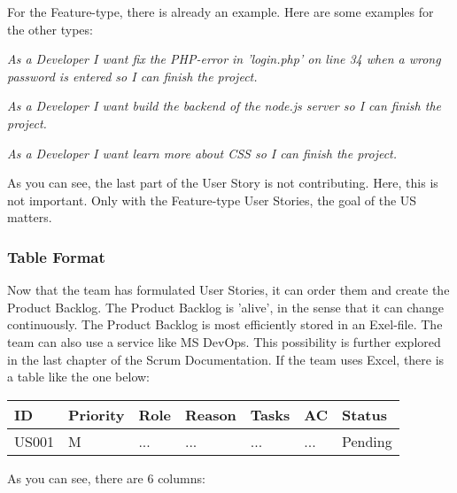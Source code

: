 \documentclass[10pt]{report}
\begin{document}
For the Feature-type, there is already an example. Here are some examples for the other types:

\emph{As a Developer I want fix the PHP-error in 'login.php' on line 34 when a wrong password is entered so I can finish the project.}

\emph{As a Developer I want build the backend of the node.js server so I can finish the project.}

\emph{As a Developer I want learn more about CSS so I can finish the project.}

As you can see, the last part of the User Story is not contributing. Here, this is not important. Only with the Feature-type User Stories, the goal of the US matters.

\subsubsection{Table Format}

Now that the team has formulated User Stories, it can order them and create the Product Backlog. The Product Backlog is 'alive', in the sense that it can change continuously. The Product Backlog is most efficiently stored in an Exel-file. The team can also use a service like MS DevOps. This possibility is further explored in the last chapter of the Scrum Documentation. If the team uses Excel, there is a table like the one below:

\medskip
\begin{tabularx}{0.8\textwidth} { 
  | >{\raggedright\arraybackslash}X 
  | >{\centering\arraybackslash}X 
  | >{\raggedright\arraybackslash}X 
  | >{\raggedright\arraybackslash}X 
  | >{\raggedright\arraybackslash}X 
  | >{\raggedright\arraybackslash}X 
  | >{\raggedleft\arraybackslash}X | }
 \hline
 ID & Priority & Role & Reason & Tasks & AC & Status \\
 \hline
 US001 & M & ... & ...  & ... & ... & Pending \\
 \hline
\end{tabularx}
\medskip

As you can see, there are 6 columns:
\end{document}
